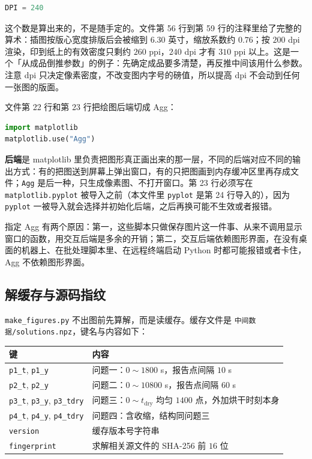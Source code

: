 \begin{lstlisting}[language=Python]
DPI = 240
\end{lstlisting}

这个数是算出来的，不是随手定的。文件第 56 行到第 59 行的注释里给了完整的算术：插图按版心宽度排版后会被缩到 $6.30$ 英寸，缩放系数约 $0.76$；按 $200$ dpi 渲染，印到纸上的有效密度只剩约 $260$ ppi，$240$ dpi 才有 $310$ ppi 以上。这是一个「从成品倒推参数」的例子：先确定成品要多清楚，再反推中间该用什么参数。注意 dpi 只决定像素密度，不改变图内字号的磅值，所以提高 dpi 不会动到任何一张图的版面。

文件第 22 行和第 23 行把绘图后端切成 Agg：

\begin{lstlisting}[language=Python]
import matplotlib
matplotlib.use("Agg")
\end{lstlisting}

\textbf{后端}是 matplotlib 里负责把图形真正画出来的那一层，不同的后端对应不同的输出方式：有的把图送到屏幕上弹出窗口，有的只把图画到内存缓冲区里再存成文件；\texttt{Agg} 是后一种，只生成像素图、不打开窗口。第 23 行必须写在 \texttt{matplotlib.pyplot} 被导入之前（本文件里 \texttt{pyplot} 是第 24 行导入的），因为 \texttt{pyplot} 一被导入就会选择并初始化后端，之后再换可能不生效或者报错。

指定 Agg 有两个原因：第一，这些脚本只做保存图片这一件事、从来不调用显示窗口的函数，用交互后端是多余的开销；第二，交互后端依赖图形界面，在没有桌面的机器上、在批处理脚本里、在远程终端启动 Python 时都可能报错或者卡住，Agg 不依赖图形界面。

\subsection{解缓存与源码指纹}

\texttt{make\_figures.py} 不出图前先算解，而是读缓存。缓存文件是 \texttt{中间数据/solutions.npz}，键名与内容如下：

\begin{center}
\begin{tabular}{@{}ll@{}}
\toprule
键 & 内容 \\
\midrule
\texttt{p1\_t}, \texttt{p1\_y} & 问题一：$0\sim1800$ s，报告点间隔 $10$ s \\
\texttt{p2\_t}, \texttt{p2\_y} & 问题二：$0\sim10800$ s，报告点间隔 $60$ s \\
\texttt{p3\_t}, \texttt{p3\_y}, \texttt{p3\_tdry} & 问题三：$0\sim t_{\mathrm{dry}}$ 均匀 $1400$ 点，外加烘干时刻本身 \\
\texttt{p4\_t}, \texttt{p4\_y}, \texttt{p4\_tdry} & 问题四：含收缩，结构同问题三 \\
\texttt{version} & 缓存版本号字符串 \\
\texttt{fingerprint} & 求解相关源文件的 SHA-256 前 $16$ 位 \\
\bottomrule
\end{tabular}
\end{center}

